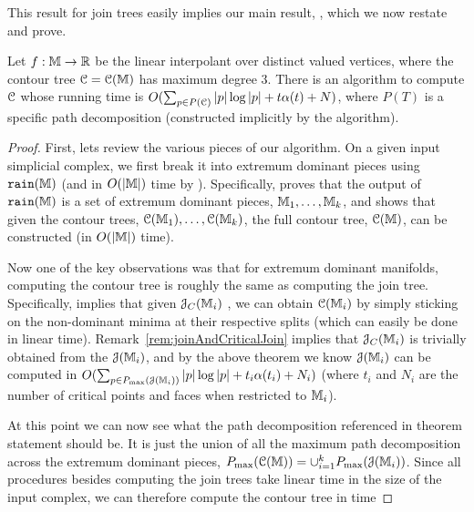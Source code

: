 {This result for join trees easily implies our main result, , which we now restate and prove.

\begin{theorem}
Let $f:\mathbb{M} \to \mathbb{R}$ be the linear interpolant over distinct valued vertices, where the contour tree ${\cal C}={\cal C}(\mathbb{M})$ has maximum degree $3$. 
There is an algorithm to compute ${\cal C}$ whose running time is $O(\sum_{p \in P({\cal C})} |p|\log |p| + t\alpha(t) + N)$,
where $P(T)$ is a specific path decomposition (constructed implicitly by the algorithm).
\end{theorem}
\begin{proof}
First, lets review the various pieces of our algorithm. 
On a given input simplicial complex, we first break it into extremum dominant pieces using ${\tt rain}(\mathbb{M})$ (and in $O(|\mathbb{M}|)$ time by ).  
Specifically,  proves that the output of ${\tt rain}(\mathbb{M})$ is a set of extremum dominant pieces, 
$\mathbb{M}_1, \dots, \mathbb{M}_k$, and  shows that given the contour trees, ${\cal C}(\mathbb{M}_1), \dots, {\cal C}(\mathbb{M}_k)$, 
the full contour tree, ${\cal C}(\mathbb{M})$, can be constructed (in $O(|\mathbb{M}|)$ time).

Now one of the key observations was that for extremum dominant manifolds, computing the contour tree is roughly the same as 
computing the join tree.  Specifically,  implies that given ${\cal J}_C(\mathbb{M}_i)$ , 
we can obtain ${\cal C}(\mathbb{M}_i)$ by simply sticking on the non-dominant minima at their respective splits (which can easily be done in linear time).
Remark~\ref{rem:joinAndCriticalJoin} implies that ${\cal J}_C(\mathbb{M}_i)$ is trivially obtained from the ${\cal J}(\mathbb{M}_i)$, and 
 by the above theorem we know ${\cal J}(\mathbb{M}_i)$ can be computed in $O(\sum_{p \in P_{\max}({\cal J}(\mathbb{M}_i))} |p|\log |p| + t_i\alpha(t_i) + N_i)$
(where $t_i$ and $N_i$ are the number of critical points and faces when restricted to $\mathbb{M}_i$).

At this point we can now see what the path decomposition referenced in theorem statement should be.  It is just the union of all the maximum 
path decomposition across the extremum dominant pieces, $P_{\max}({\cal C}(\mathbb{M})) = \cup_{i=1}^k P_{\max}({\cal J}(\mathbb{M}_i))$.
Since all procedures besides computing the join trees take linear time in the size of the input complex, we can therefore 
compute the contour tree in time
\InNotSoCGVer{
\[
O\pth{N+ \sum_{i=1}^k \pth{\sum_{p \in \pmax(\cJ(\MM_i))} |p|\log |p|} + t_i\alpha(t_i) + N_i}
=\break O\pth{\pth{\sum_{p \in \pmax(\cC(\MM))} |p|\log |p|} + t\alpha(t) + N}
\]
}


\end{proof}}
